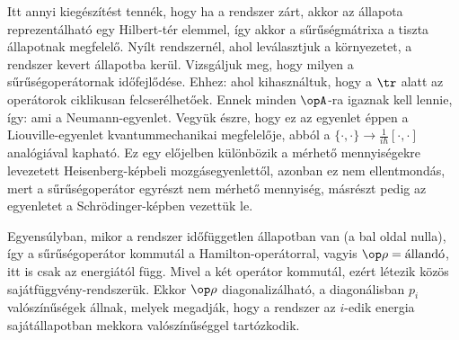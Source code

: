   Itt annyi kiegészítést tennék, hogy ha a rendszer zárt, akkor az állapota reprezentálható egy Hilbert-tér elemmel, így akkor a sűrűségmátrixa a tiszta állapotnak megfelelő.
   Nyílt rendszernél, ahol leválasztjuk a környezetet, a rendszer kevert állapotba kerül. 
  Vizsgáljuk meg, hogy milyen a sűrűségoperátornak időfejlődése.
   Ehhez:
  ahol kihasználtuk, hogy a $\tr$ alatt az operátorok ciklikusan felcserélhetőek.
   Ennek minden $\opA$-ra igaznak kell lennie, így:
  ami a Neumann-egyenlet.
   Vegyük észre, hogy ez az egyenlet éppen a Liouville-egyenlet kvantummechanikai megfelelője, abból a $\{\cdot,\cdot\}\to\frac{1}{i\hbar}[\cdot,\cdot]$ analógiával kapható.
   Ez egy előjelben különbözik a mérhető mennyiségekre levezetett Heisenberg-képbeli mozgásegyenlettől, azonban ez nem ellentmondás, mert a sűrűségoperátor egyrészt nem mérhető mennyiség, másrészt pedig az egyenletet a Schrödinger-képben vezettük le.
  
  Egyensúlyban, mikor a rendszer időfüggetlen állapotban van (a bal oldal nulla), így a sűrűségoperátor kommutál a Hamilton-operátorral, vagyis $\op\rho=\text{állandó}$, itt is csak az energiától függ.
   Mivel a két operátor kommutál, ezért létezik közös sajátfüggvény-rendszerük.
   Ekkor $\op\rho$ diagonalizálható, a diagonálisban $p_i$ valószínűségek állnak, melyek megadják, hogy a rendszer az $i$-edik energia sajátállapotban mekkora valószínűséggel tartózkodik.
